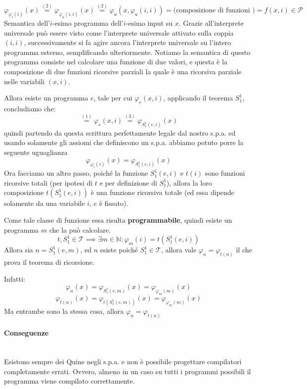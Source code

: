 \documentclass{article}
\begin{document}
$$\varphi_{\varphi_i(i)}(x)\overset{(2)}{=}\varphi_{\varphi_u(i,i)}(x)\overset{(2)}{=}\varphi_u(x,\varphi_u(i,i))=\text{(composizione di funzioni )}=f(x,i)\in\mathcal{P}$$
Semantica dell'$i$-esimo programma dell'$i$-esimo input su $x$. Grazie all'interprete
universale può essere visto come l'interprete universale attivato sulla coppia $(i,i)$,
successivamente si fa agire ancora l'interprete universale su l'intero programma esterno,
semplificando ulteriormente. Notiamo la semantica di questo programma consiste nel calcolare
una funzione di due valori, e questa è la composizione di due funzioni ricorsive parziali
la quale è una ricorsiva parziale nelle variabili $(x,i)$.

Allora esiste un programma $e$, tale per cui $\varphi_e(x,i)$, applicando il teorema $S_1^1$,
concludiamo che:
$$\overset{(1)}{=}\varphi_e(x,i)\overset{(3)}{=}\varphi_{S_1^1(e,i)}(x)$$
quindi partendo da questa scrittura perfettamente legale dal nostro s.p.a. ed
usando solamente gli assiomi che definiscono un s.p.a. abbiamo potuto porre la seguente uguaglianza
$$\varphi_{\varphi_i(i)}(x)=\varphi_{S_1^1(e,i)}(x)$$
Ora facciamo un altro passo, poiché la funzione $S_1^1(e,i)$ e $t(i)$ sono
funzioni ricorsive totali (per ipotesi di $t$ e per definizione di $S_1^1$),
allora la loro composizione $t(S_1^1(e,i))$ è una funzione ricorsiva totale (ed essa dipende solamente da una variabile
$i$, $e$ è fissato).

Come tale classe di funzione essa risulta \textbf{programmabile}, quindi
esiste un programma $m$ che la può calcolare.
$$t,S_1^1\in\mathcal{T}\implies\exists m\in\mathbb{N}:\varphi_m(i)=t(S_1^1(e,i))$$
Allora sia $n=S_1^1(e,m)$, ed $n$ esiste poiché $S_1^1\in\mathcal{T}$, allora
vale $\varphi_n=\varphi_{t(n)}$ il che prova il teorema di ricorsione.

Infatti:
$$\varphi_n(x)=\varphi_{S_1^1(e,m)}(x)=\varphi_{\varphi_m(m)}(x)$$
$$\varphi_{t(n)}(x)=\varphi_{t(S_1^1(e,m))}(x)=\varphi_{\varphi_m(m)}(x)$$
Ma entrambe sono la stessa cosa, allora $\varphi_n=\varphi_{t(n)}$

\paragraph{Conseguenze}\mbox{}\\
Esistono sempre dei Quine negli s.p.a. e non è possibile progettare compilatori completamente
errati. Ovvero, almeno in un caso su tutti i programmi possibili il programma viene compilato
correttamente.
\end{document}
